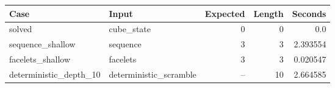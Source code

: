 {\small
\begin{tabular}{llrrr}
\hline
Case & Input & Expected & Length & Seconds \\
\hline
solved & cube\_state & 0 & 0 & 0.0 \\
sequence\_shallow & sequence & 3 & 3 & 2.393554 \\
facelets\_shallow & facelets & 3 & 3 & 0.020547 \\
deterministic\_depth\_10 & deterministic\_scramble & -- & 10 & 2.664585 \\
\hline
\end{tabular}
}
